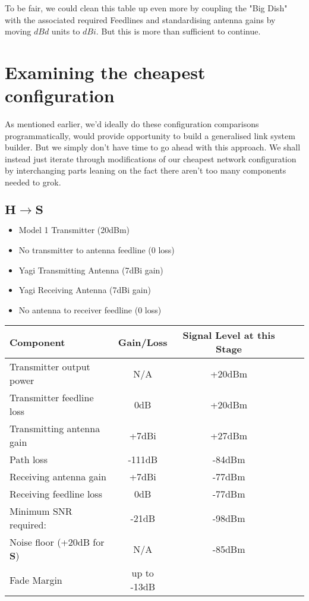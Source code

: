 \documentclass{article}
\begin{document}
To be fair, we could clean this table up even more by coupling the "Big Dish" with the associated required Feedlines and standardising antenna gains by moving $dBd$ units to $dBi$. But this is more than sufficient to continue.

\newpage
\section*{Examining the cheapest configuration}
As mentioned earlier, we'd ideally do these configuration comparisons programmatically, would provide opportunity to build a generalised link system builder. But we simply don't have time to go ahead with this approach. We shall instead just iterate through modifications of our cheapest network configuration by interchanging parts leaning on the fact there aren't too many components needed to grok.

\subsection*{$\boldsymbol{H} \rightarrow \boldsymbol{S}$}
\begin{itemize}
				\item Model 1 Transmitter (20dBm)
				\item No transmitter to antenna feedline (0 loss)
				\item Yagi Transmitting Antenna (7dBi gain)
				\item Yagi Receiving Antenna (7dBi gain)
				\item No antenna to receiver feedline (0 loss)
\end{itemize}

\begin{table}[h]
\centering
    \begin{tabular}{lcccl}
				\toprule Component & Gain/Loss & Signal Level at this Stage \\
				\midrule
				Transmitter output power & N/A & +20dBm \\
				\midrule
				Transmitter feedline loss & 0dB & +20dBm \\
				\midrule
				Transmitting antenna gain & +7dBi & +27dBm \\
				\midrule
				Path loss & -111dB & -84dBm \\
				\midrule
				Receiving antenna gain & +7dBi & -77dBm \\
				\midrule
				Receiving feedline loss & 0dB & -77dBm \\
				\midrule
				Minimum SNR required: & -21dB & -98dBm \\
				\midrule
				Noise floor (+20dB for $\boldsymbol{S}$) & N/A & -85dBm \\
				\midrule
				Fade Margin & up to -13dB & \\
				\bottomrule
    \end{tabular}
\end{table}
\end{document}
